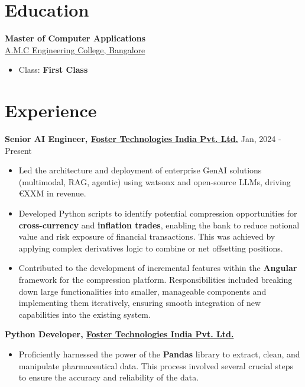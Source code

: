 \documentclass[margin, centered]{res}
\begin{document}
\begin{resume}

\section{Education}
\textbf{Master of Computer Applications}  \\
\href{}{A.M.C Engineering College, Bangalore}
\begin{itemize}
 \item Class:  \textbf{First Class} 
\end{itemize}

 
\section{Experience}
\textbf{Senior AI Engineer, \href{http://www.fostercraft.com}{Foster Technologies India Pvt. Ltd.}} \hfill Jan, 2024 - Present\\
\begin{itemize}
    \item Led the architecture and deployment of enterprise GenAI solutions (multimodal, RAG, agentic) using watsonx and open-source LLMs, driving €XXM in revenue.

    \item Developed Python scripts to identify potential compression opportunities for \textbf{cross-currency} and \textbf{inflation trades}, enabling the bank to reduce notional value and risk exposure of financial transactions. This was achieved by applying complex derivatives logic to combine or net offsetting positions.

    \item Contributed to the development of incremental features within the \textbf{Angular} framework for the compression platform. Responsibilities included breaking down large functionalities into smaller, manageable components and implementing them iteratively, ensuring smooth integration of new capabilities into the existing system.
\end{itemize}
\textbf{Python Developer, \href{http://www.fostercraft.com}{Foster Technologies India Pvt. Ltd.}}\\
\begin{itemize}
    \item Proficiently harnessed the power of the \textbf{Pandas} library to extract, clean, and manipulate pharmaceutical data. This process involved several crucial steps to ensure the accuracy and reliability of the data.


\end{itemize}
\end{resume}
\end{document}
